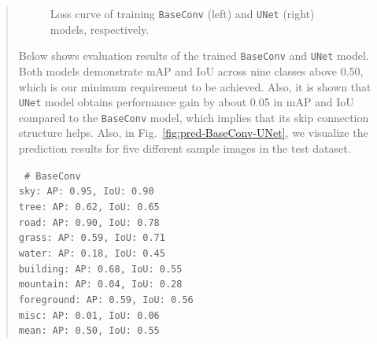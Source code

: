 \documentclass[11pt]{article}
\begin{document}
\begin{quote}
\begin{figure}[h]
    \centering
    \qquad
    \caption{Loss curve of training \texttt{BaseConv} (left) and \texttt{UNet} (right) models, respectively.}
    \label{fig:loss-BaseConv-UNet}
\end{figure}

Below shows evaluation results of the trained \texttt{BaseConv} and \texttt{UNet} model. Both models demonstrate mAP and IoU across nine classes above 0.50, which is our minimum requirement to be achieved. Also, it is shown that \texttt{UNet} model obtains performance gain by about 0.05 in mAP and IoU compared to the \texttt{BaseConv} model, which implies that its skip connection structure helps. Also, in Fig.~\ref{fig:pred-BaseConv-UNet}, we visualize the prediction results for five different sample images in the test dataset.

{\centering \tt \small
\# BaseConv \\
sky: AP: 0.95, IoU: 0.90 \\
tree: AP: 0.62, IoU: 0.65 \\
road: AP: 0.90, IoU: 0.78 \\
grass: AP: 0.59, IoU: 0.71 \\
water: AP: 0.18, IoU: 0.45 \\
building: AP: 0.68, IoU: 0.55 \\
mountain: AP: 0.04, IoU: 0.28 \\
foreground: AP: 0.59, IoU: 0.56 \\
misc: AP: 0.01, IoU: 0.06 \\
mean: AP: 0.50, IoU: 0.55 \\

}
\end{quote}
\end{document}

